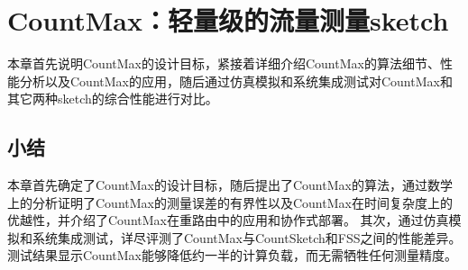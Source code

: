 % 

\chapter{CountMax：轻量级的流量测量sketch}\label{chap:countmax}
本章首先说明CountMax的设计目标，紧接着详细介绍CountMax的算法细节、性能分析以及CountMax的应用，随后通过仿真模拟和系统集成测试对CountMax和其它两种sketch的综合性能进行对比。





\section{小结}
本章首先确定了CountMax的设计目标，随后提出了CountMax的算法，通过数学上的分析证明了CountMax的测量误差的有界性以及CountMax在时间复杂度上的优越性，并介绍了CountMax在重路由中的应用和协作式部署。
其次，通过仿真模拟和系统集成测试，详尽评测了CountMax与CountSketch和FSS之间的性能差异。
测试结果显示CountMax能够降低约一半的计算负载，而无需牺牲任何测量精度。